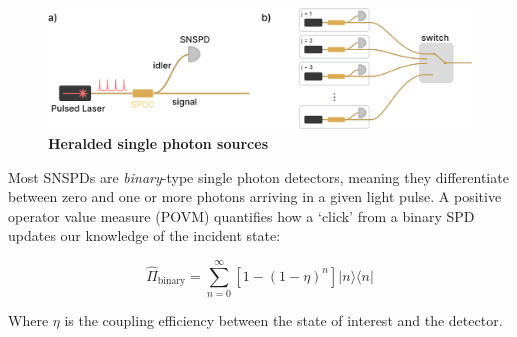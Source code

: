 \documentclass[12pt]{caltech_thesis}
\begin{document}
\hypertarget{fig:hsps}{%
\begin{figure}
\centering
\includegraphics{chapter_05/figs_05/hsps_light.pdf}
\caption[{Heralded single photon source designs}]{\textbf{Heralded
single photon sources}}
\label{fig:hsps}
\end{figure}
}

Most SNSPDs are \emph{binary}-type single photon detectors, meaning they
differentiate between zero and one or more photons arriving in a given
light pulse. A positive operator value measure (POVM) quantifies how a
`click' from a binary SPD updates our knowledge of the incident state:

\[\hat{\Pi}_{\text {binary}} = \sum_{n=0}^{\infty}\left[1-(1-\eta)^{n}\right]|n\rangle\langle n|\]

Where \(\eta\) is the coupling efficiency between the state of interest
and the detector.
\end{document}
